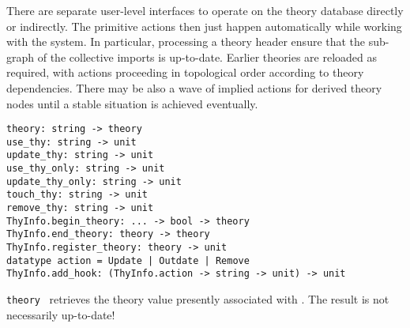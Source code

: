 \begin{isabellebody}
\begin{isamarkuptext}
  \medskip There are separate user-level interfaces to operate on the
  theory database directly or indirectly.  The primitive actions then
  just happen automatically while working with the system.  In
  particular, processing a theory header  ensure that the
  sub-graph of the collective imports 
  is up-to-date.  Earlier theories are reloaded as required, with
   actions proceeding in topological order according to
  theory dependencies.  There may be also a wave of implied  actions for derived theory nodes until a stable situation
  is achieved eventually.%
\end{isamarkuptext}%
\isamarkuptrue%
%
\isadelimmlref
%
\endisadelimmlref
%
\isatagmlref
%
\begin{isamarkuptext}%
\begin{mldecls}
  \verb|theory: string -> theory| \\
  \verb|use_thy: string -> unit| \\
  \verb|update_thy: string -> unit| \\
  \verb|use_thy_only: string -> unit| \\
  \verb|update_thy_only: string -> unit| \\
  \verb|touch_thy: string -> unit| \\
  \verb|remove_thy: string -> unit| \\[1ex]
  \verb|ThyInfo.begin_theory|\verb|: ... -> bool -> theory| \\
  \verb|ThyInfo.end_theory: theory -> theory| \\
  \verb|ThyInfo.register_theory: theory -> unit| \\[1ex]
  \verb|datatype action = Update |\verb,|,\verb| Outdate |\verb,|,\verb| Remove| \\
  \verb|ThyInfo.add_hook: (ThyInfo.action -> string -> unit) -> unit| \\
  \end{mldecls}

  \begin{description}

  \item \verb|theory|~ retrieves the theory value presently
  associated with .  The result is not necessarily
  up-to-date!


\end{description}
\end{isamarkuptext}
\end{isabellebody}

